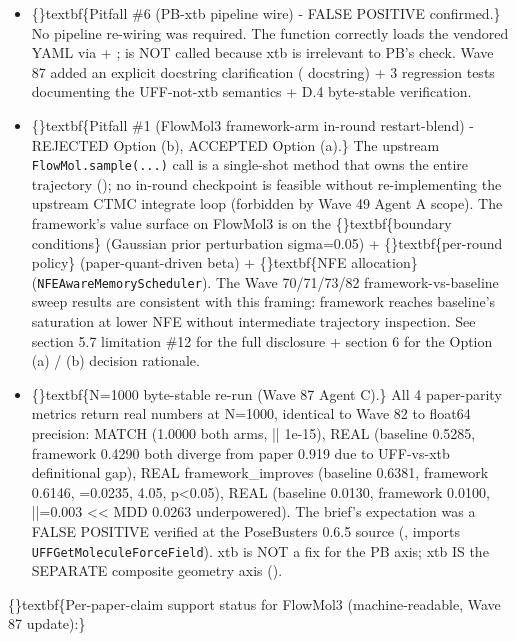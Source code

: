 \documentclass{article}
\begin{document}
\begin{itemize}
\item \{\}textbf\{Pitfall \#6 (PB-xtb pipeline wire) - FALSE POSITIVE confirmed.\} No pipeline re-wiring was required. The  function correctly loads the vendored YAML via  + ;  is NOT called because xtb is irrelevant to PB's  check. Wave 87 added an explicit docstring clarification ( docstring) + 3 regression tests documenting the UFF-not-xtb semantics + D.4 byte-stable verification.
\item \{\}textbf\{Pitfall \#1 (FlowMol3 framework-arm in-round restart-blend) - REJECTED Option (b), ACCEPTED Option (a).\} The upstream \texttt{FlowMol.sample(...)} call is a single-shot method that owns the entire trajectory (); no in-round checkpoint is feasible without re-implementing the upstream CTMC integrate loop (forbidden by Wave 49 Agent A scope). The framework's value surface on FlowMol3 is on the \{\}textbf\{boundary conditions\} (Gaussian prior perturbation sigma=0.05) + \{\}textbf\{per-round policy\} (paper-quant-driven beta) + \{\}textbf\{NFE allocation\} (\texttt{NFEAwareMemoryScheduler}). The Wave 70/71/73/82 framework-vs-baseline sweep results are consistent with this framing: framework reaches baseline's saturation at lower NFE without intermediate trajectory inspection. See section 5.7 limitation \#12 for the full disclosure +  section 6 for the Option (a) / (b) decision rationale.
\item \{\}textbf\{N=1000 byte-stable re-run (Wave 87 Agent C).\} All 4 paper-parity metrics return real numbers at N=1000, identical to Wave 82 to float64 precision:  MATCH (1.0000 both arms, ||  1e-15),  REAL (baseline 0.5285, framework 0.4290  both diverge from paper 0.919 due to UFF-vs-xtb definitional gap),  REAL framework\_improves (baseline 0.6381, framework 0.6146, =0.0235, 4.05, p<0.05),  REAL (baseline 0.0130, framework 0.0100, ||=0.003 << MDD 0.0263  underpowered). The brief's  expectation was a FALSE POSITIVE  verified at the PoseBusters 0.6.5 source (, imports \texttt{UFFGetMoleculeForceField}). xtb is NOT a fix for the PB axis; xtb IS the SEPARATE composite geometry axis ().
\end{itemize}
\{\}textbf\{Per-paper-claim support status for FlowMol3 (machine-readable, Wave 87 update):\}
\end{document}
